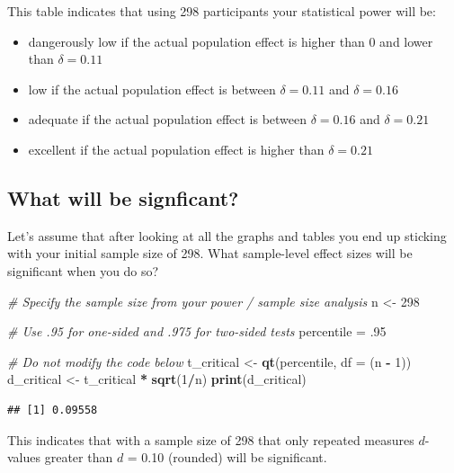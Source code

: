 \documentclass[
]{krantz}
\makeatletter
\newenvironment{Shaded}{\begin{snugshade}}{\end{snugshade}}
\newcommand{\CommentTok}[1]{\textcolor[rgb]{0.37,0.37,0.37}{\textit{#1}}}
\newcommand{\DataTypeTok}[1]{\textcolor[rgb]{0.27,0.27,0.27}{#1}}
\newcommand{\DecValTok}[1]{\textcolor[rgb]{0.06,0.06,0.06}{#1}}
\newcommand{\FloatTok}[1]{\textcolor[rgb]{0.06,0.06,0.06}{#1}}
\newcommand{\KeywordTok}[1]{\textcolor[rgb]{0.27,0.27,0.27}{\textbf{#1}}}
\newcommand{\NormalTok}[1]{#1}
\newcommand{\OperatorTok}[1]{\textcolor[rgb]{0.43,0.43,0.43}{\textbf{#1}}}
\newcommand{\StringTok}[1]{\textcolor[rgb]{0.5,0.5,0.5}{#1}}
\newenvironment{kframe}{%
\medskip{}
\setlength{\fboxsep}{.8em}
 \def\at@end@of@kframe{}%
 \ifinner\ifhmode%
  \def\at@end@of@kframe{\end{minipage}}%
  \begin{minipage}{\columnwidth}%
 \fi\fi%
 \def\FrameCommand##1{\hskip\@totalleftmargin \hskip-\fboxsep
 \colorbox{shadecolor}{##1}\hskip-\fboxsep
     \hskip-\linewidth \hskip-\@totalleftmargin \hskip\columnwidth}%
 \MakeFramed {\advance\hsize-\width
   \@totalleftmargin\z@ \linewidth\hsize
   \@setminipage}}%
 {\par\unskip\endMakeFramed%
 \at@end@of@kframe}
\renewenvironment{Shaded}{\begin{kframe}}{\end{kframe}}
\makeatother
\begin{document}
This table indicates that using 298 participants your statistical power will be:

\begin{itemize}
\item
  dangerously low if the actual population effect is higher than 0 and lower than \(\delta = 0.11\)
\item
  low if the actual population effect is between \(\delta = 0.11\) and \(\delta = 0.16\)
\item
  adequate if the actual population effect is between \(\delta = 0.16\) and \(\delta = 0.21\)
\item
  excellent if the actual population effect is higher than \(\delta = 0.21\)
\end{itemize}

\hypertarget{what-will-be-signficant-1}{%
\subsection{What will be signficant?}\label{what-will-be-signficant-1}}

Let's assume that after looking at all the graphs and tables you end up sticking with your initial sample size of 298. What sample-level effect sizes will be significant when you do so?

\begin{Shaded}
\begin{Highlighting}[]
\CommentTok{# Specify the sample size from your power / sample size analysis}
\NormalTok{n <-}\StringTok{ }\DecValTok{298}

\CommentTok{# Use .95 for one-sided and .975 for two-sided tests}
\NormalTok{percentile =}\StringTok{ }\FloatTok{.95} 

\CommentTok{# Do not modify the code below}
\NormalTok{t_critical <-}\StringTok{ }\KeywordTok{qt}\NormalTok{(percentile, }\DataTypeTok{df =}\NormalTok{ (n }\OperatorTok{-}\StringTok{ }\DecValTok{1}\NormalTok{))}
\NormalTok{d_critical <-}\StringTok{ }\NormalTok{t_critical }\OperatorTok{*}\StringTok{ }\KeywordTok{sqrt}\NormalTok{(}\DecValTok{1}\OperatorTok{/}\NormalTok{n)}
\KeywordTok{print}\NormalTok{(d_critical)}
\end{Highlighting}
\end{Shaded}

\begin{verbatim}
## [1] 0.09558
\end{verbatim}

This indicates that with a sample size of 298 that only repeated measures \(d\)-values greater than \(d\) = 0.10 (rounded) will be significant.
\end{document}
